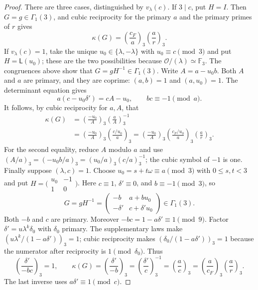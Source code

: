 \documentclass[11pt,a4paper]{article}
\numberwithin{equation}{section}
\numberwithin{figure}{section}
\theoremstyle{definition}
\theoremstyle{remark}
\begin{document}
\begin{proof}
There are three cases, distinguished by $v_\lambda(c)$.
If $3\mid c$, put $H=I$.  Then $G=g\in\Gamma_1(3)$, and cubic
reciprocity for the primary $a$ and the primary primes of $r$ gives
\begin{equation}\label{eq:reflection-cusp-case-zero}
 \kappa(G)=\left(\frac{c_F}{a}\right)_3
             \left(\frac ar\right)_3.
\end{equation}
If $v_\lambda(c)=1$, take the unique $u_0\in\{\lambda,-\lambda\}$
with $u_0\equiv c\pmod3$ and put $H=\mathsf L(u_0)$; these are the two
possibilities because $\mathcal O/(\lambda)\simeq\mathbb F_3$.
The congruences above show that $G=gH^{-1}\in\Gamma_1(3)$.
Write $A=a-u_0b$.  Both $A$ and $a$ are primary, and they are coprime:
$(a,b)=1$ and $(a,u_0)=1$.  The determinant equation gives
\[
 a(c-u_0\delta')=cA-u_0,
 \qquad bc\equiv-1\pmod a.
\]
It follows, by cubic reciprocity for $a,A$, that
\[
 \begin{split}
 \kappa(G)
 &=\left(\frac{-u_0}{A}\right)_3
          \left(\frac aA\right)_3^{-1}\\
 &=\left(\frac{-u_0}{A}\right)_3
          \left(\frac{c/u_0}{a}\right)_3
  =\left(\frac{-u_0}{A}\right)_3
          \left(\frac{c_F/u_0}{a}\right)_3
          \left(\frac ar\right)_3.
 \end{split}
\]
For the second equality, reduce $A$ modulo $a$ and use
$(A/a)_3=(-u_0b/a)_3=(u_0/a)_3(c/a)_3^{-1}$; the cubic symbol of
$-1$ is one.  Finally suppose $(\lambda,c)=1$.  Choose
$u_0=s+t\omega\equiv a\pmod3$ with $0\le s,t<3$ and put
$H=\bigl(\begin{smallmatrix}u_0&-1\\1&0\end{smallmatrix}\bigr)$.
Here $c\equiv1$, $\delta'\equiv0$, and $b\equiv-1\pmod3$, so
\[
 G=gH^{-1}=\begin{pmatrix}-b&a+bu_0\\-\delta'&c+\delta'u_0\end{pmatrix}
       \in\Gamma_1(3).
\]
Both $-b$ and $c$ are primary.  Moreover $-bc=1-a\delta'\equiv1\pmod9$.
Factor $\delta'=u\lambda^k\delta_0$ with $\delta_0$ primary.  The
supplementary laws make $(u\lambda^k/(1-a\delta'))_3=1$; cubic
reciprocity makes $(\delta_0/(1-a\delta'))_3=1$ because the numerator
after reciprocity is $1\pmod{\delta_0}$.  Thus
\[
 \left(\frac{\delta'}{-bc}\right)_3=1,
 \qquad
 \kappa(G)=\left(\frac{\delta'}{-b}\right)_3
          =\left(\frac{\delta'}c\right)_3^{-1}
          =\left(\frac ac\right)_3
          =\left(\frac a{c_F}\right)_3\left(\frac ar\right)_3.
\]
The last inverse uses $a\delta'\equiv1\pmod c$.


\end{proof}
\end{document}
